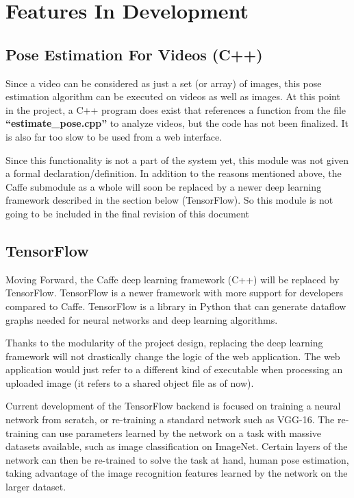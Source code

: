 \documentclass{scrreprt}
\begin{document}
\break

\section{Features In Development}

\subsection{Pose Estimation For Videos (C++)}

Since a video can be considered as just a set (or array) of images, this pose
estimation algorithm can be executed on videos as well as images. At this point
in the project, a C++ program does exist that references a function from the
file \textbf{``estimate\_pose.cpp''} to analyze videos, but the code has not
been finalized. It is also far too slow to be used from a web interface.

Since this functionality is not a part of the system yet, this module was not
given a formal declaration/definition. In addition to the reasons mentioned
above, the Caffe submodule as a whole will soon be replaced by a newer deep
learning framework described in the section below (TensorFlow). So this module
is not going to be included in the final revision of this document

\subsection{TensorFlow}

Moving Forward, the Caffe deep learning framework (C++) will be replaced by
TensorFlow. TensorFlow is a newer framework with more support for developers
compared to Caffe. TensorFlow is a library in Python that can generate dataflow
graphs needed for neural networks and deep learning algorithms.

Thanks to the modularity of the project design, replacing the deep learning
framework will not drastically change the logic of the web application. The web
application would just refer to a different kind of executable when processing
an uploaded image (it refers to a shared object file as of now).

Current development of the TensorFlow backend is focused on training a neural
network from scratch, or re-training a standard network such as VGG-16. The
re-training can use parameters learned by the network on a task with massive
datasets available, such as image classification on ImageNet. Certain layers of
the network can then be re-trained to solve the task at hand, human pose
estimation, taking advantage of the image recognition features learned by the
network on the larger dataset.
\end{document}
